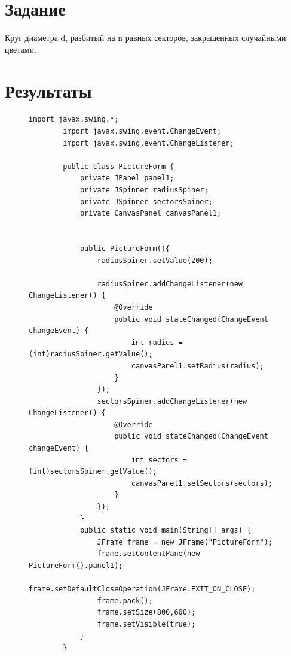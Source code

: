 \documentclass[a4paper, 14pt]{extarticle}
\begin{document}
	\renewcommand{\ttdefault}{pcr}
	
	\setlength{\tabcolsep}{3pt}
	\newpage
	\setcounter{page}{2}
	
	\section{Задание}\label{Sect::task}
	
	Круг диаметра d, разбитый на n равных секторов, закрашенных случайными цветами.
	
	\section{Результаты}\label{Sect::res}
	\begin{figure}[!htb]
		\begin{lstlisting}[language={},caption={Класс PictureForm},label={lst:code1}]
		import javax.swing.*;
		import javax.swing.event.ChangeEvent;
		import javax.swing.event.ChangeListener;
		
		public class PictureForm {
			private JPanel panel1;
			private JSpinner radiusSpiner;
			private JSpinner sectorsSpiner;
			private CanvasPanel canvasPanel1;
			
			
			public PictureForm(){
				radiusSpiner.setValue(200);
				
				radiusSpiner.addChangeListener(new ChangeListener() {
					@Override
					public void stateChanged(ChangeEvent changeEvent) {
						int radius = (int)radiusSpiner.getValue();
						canvasPanel1.setRadius(radius);
					}
				});
				sectorsSpiner.addChangeListener(new ChangeListener() {
					@Override
					public void stateChanged(ChangeEvent changeEvent) {
						int sectors = (int)sectorsSpiner.getValue();
						canvasPanel1.setSectors(sectors);
					}
				});
			}
			public static void main(String[] args) {
				JFrame frame = new JFrame("PictureForm");
				frame.setContentPane(new PictureForm().panel1);
				frame.setDefaultCloseOperation(JFrame.EXIT_ON_CLOSE);
				frame.pack();
				frame.setSize(800,600);
				frame.setVisible(true);
			}	
		}
		\end{lstlisting}
	\end{figure}
	
	\newpage
	
\end{document}

